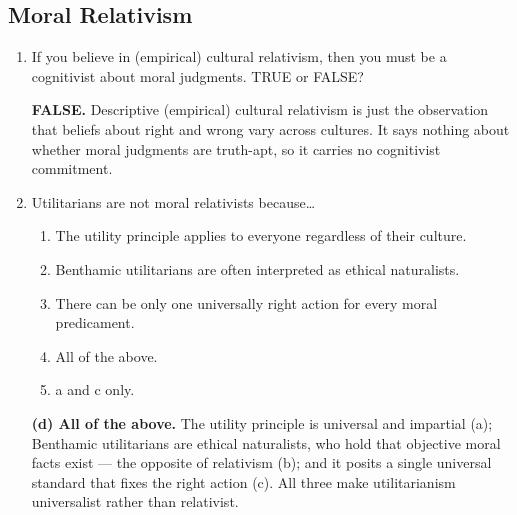 \documentclass[12pt]{article}
\begin{document}
\subsection{Moral Relativism}
\begin{enumerate}
    \item If you believe in (empirical) cultural relativism, then you must be a cognitivist about moral judgments. TRUE or FALSE?
    \begin{answer}\textbf{FALSE.} Descriptive (empirical) cultural relativism is just the observation that beliefs about right and wrong vary across cultures. It says nothing about whether moral judgments are truth-apt, so it carries no cognitivist commitment.\end{answer}
    \item Utilitarians are not moral relativists because…
    \begin{enumerate}
        \item The utility principle applies to everyone regardless of their culture.
        \item Benthamic utilitarians are often interpreted as ethical naturalists.
        \item There can be only one universally right action for every moral predicament.
        \item All of the above.
        \item a and c only.
    \end{enumerate}
    \begin{answer}\textbf{(d) All of the above.} The utility principle is universal and impartial (a); Benthamic utilitarians are ethical naturalists, who hold that objective moral facts exist --- the opposite of relativism (b); and it posits a single universal standard that fixes the right action (c). All three make utilitarianism universalist rather than relativist.\end{answer}
\end{enumerate}
\end{document}
